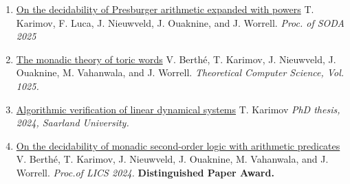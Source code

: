 \documentclass{article}
\begin{document}
    \begin{enumerate}
    
            \item 
            \href{https://toghrul-karimov.github.io/assets/papers/presburger-235.pdf}{\large On the     decidability of Presburger arithmetic expanded with powers}
            \vspace*{0.2cm}\newline
            T. Karimov, F. Luca, J. Nieuwveld, J. Ouaknine, and J. Worrell.
		\vspace*{0.2cm}\newline\emph{Proc. of SODA 2025}
            \vspace{0.2cm}

            \item\href{https://doi.org/10.2016/j.tcs.2024.114959}{\large The monadic theory of toric words}
            \vspace*{0.2cm}\newline
            V. Berth\'e, T. Karimov, J. Nieuwveld, J. Ouaknine, M. Vahanwala, and J. Worrell.
		\vspace*{0.2cm}\newline\emph{Theoretical Computer Science, Vol. 1025.}
            \vspace*{0.2cm}
            
            \item \href{https://publikationen.sulb.uni-saarland.de/handle/20.500.21880/37285}{\large Algorithmic verification of linear dynamical systems}
            \vspace*{0.2cm}\newline
		T. Karimov
		\vspace*{0.2cm}\newline\emph{PhD thesis, 2024, Saarland University.}
		\vspace{0.2cm}
  
		\item \href{https://doi.org/10.2145/3661814.3662119}{\large On the decidability of monadic second-order logic with arithmetic predicates}
            \vspace*{0.2cm}
		\newline
            V. Berth\'e, T. Karimov, J. Nieuwveld, J. Ouaknine, M. Vahanwala, and J. Worrell.
		\vspace*{0.2cm}\newline\emph{Proc.\@ of LICS 2024.} \textbf{Distinguished Paper Award.} 
		\vspace*{0.2cm}
  

\end{enumerate}
\end{document}
